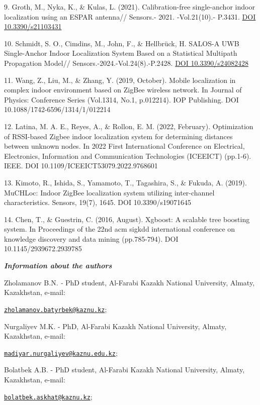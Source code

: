 9. Groth, M., Nyka, K., \& Kulas, L. (2021). Calibration-free
single-anchor indoor localization using an ESPAR antenna// Sensors.-
2021. -Vol.21(10).- P.3431. \href{https://doi.org/10.3390/s21103431}{DOI
10.3390/s21103431}

10. Schmidt, S. O., Cimdins, M., John, F., \& Hellbrück, H. SALOS-A UWB
Single-Anchor Indoor Localization System Based on a Statistical
Multipath Propagation Model// Sensors.-2024.-Vol.24(8).-P.2428.
\href{https://doi.org/10.3390/s24082428}{DOI 10.3390/s24082428}

11. Wang, Z., Liu, M., \& Zhang, Y. (2019, October). Mobile localization
in complex indoor environment based on ZigBee wireless network. In
Journal of Physics: Conference Series (Vol.1314, No.1, p.012214). IOP
Publishing. DOI 10.1088/1742-6596/1314/1/012214

12. Latina, M. A. E., Reyes, A., \& Rollon, E. M. (2022, February).
Optimization of RSSI-based Zigbee indoor localization system for
determining distances between unknown nodes. In 2022 First International
Conference on Electrical, Electronics, Information and Communication
Technologies (ICEEICT) (pp.1-6). IEEE. DOI
10.1109/ICEEICT53079.2022.9768601

13. Kimoto, R., Ishida, S., Yamamoto, T., Tagashira, S., \& Fukuda, A.
(2019). MuCHLoc: Indoor ZigBee localization system utilizing
inter-channel characteristics. Sensors, 19(7), 1645. DOI
10.3390/s19071645

14. Chen, T., \& Guestrin, C. (2016, August). Xgboost: A scalable tree
boosting system. In Proceedings of the 22nd acm sigkdd international
conference on knowledge discovery and data mining (pp.785-794). DOI
10.1145/2939672.2939785

\emph{{\bfseries Information about the authors}}

Zholamanov B.N. \emph{-} PhD student, Al-Farabi Kazakh National
University, Almaty, Kazakhstan, e-mail:

\href{mailto:zholamanov.batyrbek@kaznu.kz}{\nolinkurl{zholamanov.batyrbek@kaznu.kz}};

Nurgaliyev M.K. - PhD, Al-Farabi Kazakh National University, Almaty,
Kazakhstan, e-mail:

\href{mailto:madiyar.nurgaliyev@kaznu.edu.kz}{\nolinkurl{madiyar.nurgaliyev@kaznu.edu.kz}};

Bolatbek A.B. - PhD student, Al-Farabi Kazakh National University,
Almaty, Kazakhstan, e-mail:

\href{mailto:bolatbek.askhat@kaznu.kz}{\nolinkurl{bolatbek.askhat@kaznu.kz}};

